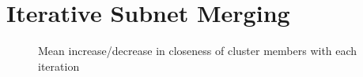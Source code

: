 \section{Iterative Subnet Merging} \label{sect:merging}

\begin{figure}
    \caption{Mean increase/decrease in closeness of cluster members with each iteration}
\end{figure}
